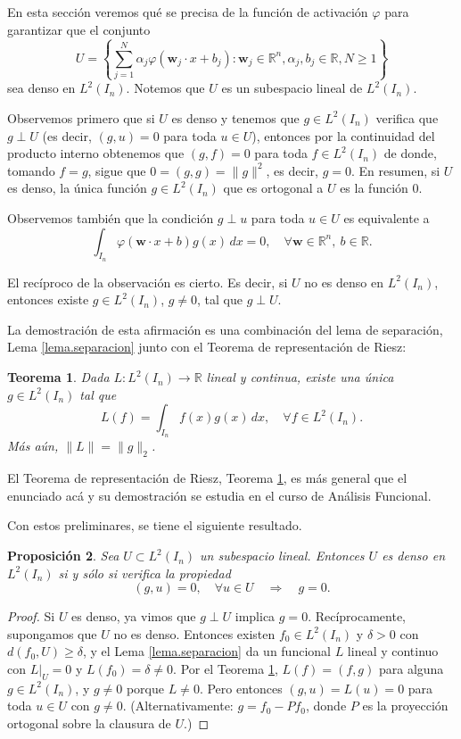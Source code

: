 \documentclass[12pt, a4paper]{amsbook}
\newcommand{\R}{{\mathbb R}}
\newcommand{\ww}{{\mathbf w}}
\newtheorem{teo}{Teorema}[section]
\newtheorem{prop}[teo]{Proposici\'on}
\theoremstyle{remark}
\theoremstyle{definition}
\numberwithin{section}{chapter}
\numberwithin{subsection}{section}
\numberwithin{equation}{section}
\numberwithin{figure}{chapter}
\begin{document}
En esta sección veremos qué se precisa de la función de activación $\varphi$ para garantizar que el conjunto
$$
U = \left\{ \sum_{j=1}^N \alpha_j \varphi(\ww_j \cdot x + b_j)\colon \ww_j\in\R^n, \alpha_j, b_j\in\R, N\ge 1\right\}
$$
sea denso en $L^2(I_n)$. Notemos que $U$ es un subespacio lineal de $L^2(I_n)$.

Observemos primero que si $U$ es denso y tenemos que $g\in L^2(I_n)$ verifica que $g\perp U$ (es decir, $(g, u)=0$ para toda $u\in U$), entonces por la continuidad del producto interno obtenemos que $(g, f)=0$ para toda $f\in L^2(I_n)$ de donde, tomando $f=g$, sigue que $0=(g, g)=\|g\|^2$, es decir, $g=0$. En resumen, si $U$ es denso, la única función $g\in L^2(I_n)$ que es ortogonal a $U$ es la función $0$.

Observemos también que la condición $g\perp u$ para toda $u\in U$ es equivalente a
$$
\int_{I_n} \varphi(\ww\cdot x + b) g(x)\, dx=0,\quad \forall \ww\in\R^n,\ b\in\R.
$$

El recíproco de la observación es cierto. Es decir, si $U$ no es denso en $L^2(I_n)$, entonces existe $g\in L^2(I_n)$, $g\neq 0$, tal que $g\perp U$.

La demostración de esta afirmación es una combinación del lema de separación, Lema \ref{lema.separacion} junto con el Teorema de representación de Riesz:
\begin{teo}\label{teo.Riesz}
Dada $L\colon L^2(I_n)\to \R$ lineal y continua, existe una única $g\in L^2(I_n)$ tal que
$$
L(f) = \int_{I_n} f(x) g(x)\, dx,\quad \forall f\in L^2(I_n).
$$
Más aún, $\|L\| = \|g\|_2$.
\end{teo}

El Teorema de representación de Riesz, Teorema \ref{teo.Riesz}, es más general que el enunciado acá y su demostración se estudia en el curso de Análisis Funcional.

Con estos preliminares, se tiene el siguiente resultado.
\begin{prop}
Sea $U\subset L^2(I_n)$ un subespacio lineal. Entonces $U$ es denso en $L^2(I_n)$ si y sólo si verifica la propiedad
$$
(g, u) = 0,\quad \forall u\in U \quad \Longrightarrow \quad g=0.
$$
\end{prop}

\begin{proof}
Si $U$ es denso, ya vimos que $g\perp U$ implica $g=0$. Recíprocamente, supongamos que $U$ no es denso. Entonces existen $f_0\in L^2(I_n)$ y $\delta>0$ con $d(f_0,U)\ge\delta$, y el Lema \ref{lema.separacion} da un funcional $L$ lineal y continuo con $L|_U=0$ y $L(f_0)=\delta\neq0$. Por el Teorema \ref{teo.Riesz}, $L(f)=(f,g)$ para alguna $g\in L^2(I_n)$, y $g\neq0$ porque $L\neq0$. Pero entonces $(g,u)=L(u)=0$ para toda $u\in U$ con $g\ne0$. (Alternativamente: $g=f_0-P f_0$, donde $P$ es la proyección ortogonal sobre la clausura de $U$.)
\end{proof}
\end{document}
